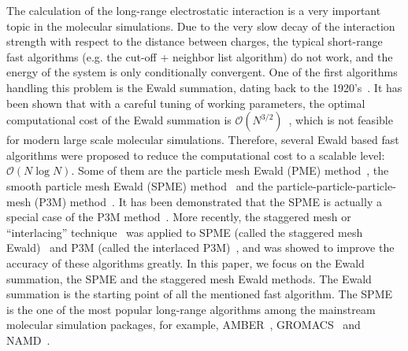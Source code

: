 \documentclass[aps,pre,preprint,unsortedaddress]{revtex4}
\newcommand{\recheck}[1]{{\color{red} #1}}
\begin{document}
The calculation of the long-range electrostatic interaction is a very
important topic in the molecular simulations.  Due to the very slow
decay of the interaction strength with respect to the distance between charges,
the typical short-range fast algorithms (e.g. the cut-off + neighbor list
algorithm) do not work, and the
energy of the system is only conditionally convergent.  One of the
first algorithms handling this problem is the Ewald summation, dating
back to the 1920's~\cite{ewald1921die}.  It has been shown that
with a careful tuning of working parameters, the optimal computational
cost of the Ewald summation is  $\mathcal
O(N^{3/2})$~\cite{perram1988asc}, which is not feasible for modern
large scale molecular simulations.
Therefore, several Ewald based fast algorithms were proposed to reduce the
computational cost to a scalable level: $\mathcal O(N\log N)$. Some of them
are
the particle mesh Ewald (PME)
method~\cite{darden1993pme}, the smooth particle mesh Ewald (SPME)
method~\cite{essmann1995spm} and the particle-particle-particle-mesh
(P3M) method~\cite{hockney1988computer, deserno1998mue1}.
\recheck{
It has been demonstrated that the SPME is actually
a special case of the P3M method~\cite{deserno1998mue1, ballenegger2012convert}.}
More recently, the staggered mesh or
``interlacing'' technique~\cite{chen1974reduction,eastwood1976optimal}
was applied to SPME
(called the staggered mesh Ewald)~\cite{cerutti2009staggered} and P3M
(called the interlaced P3M)~\cite{neelov2010interlaced}, and was showed to
improve the accuracy of these algorithms greatly.
In this paper, we focus on the Ewald summation, the SPME and
the staggered mesh Ewald methods. The Ewald summation is the starting
point of all the mentioned fast algorithm. The SPME
is the one of the most popular long-range algorithms among
the mainstream molecular simulation packages, for example,
AMBER~\cite{case2005amber}, GROMACS~\cite{van2005gromacs,
  hess2008gromacs} and NAMD~\cite{phillips2005scalable}.
\end{document}
